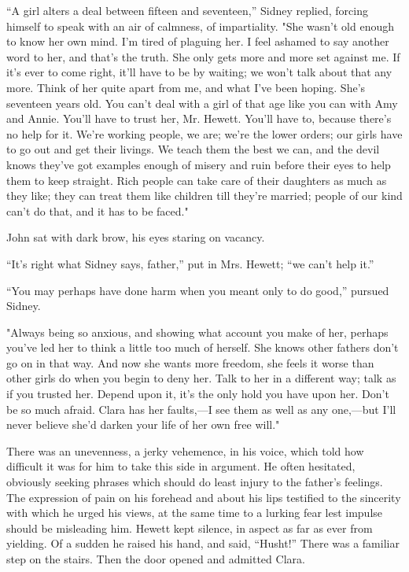 ``A girl alters a deal between fifteen and seventeen,'' Sidney replied,
forcing himself to speak with an air of calmness, of impartiality. "She
wasn't old enough to know her own mind. I'm tired of plaguing her. I
feel ashamed to say another word to her, and that's the truth. She only
gets more and more set against me. If it's ever to come right, it'll
have to be by waiting; we won't talk about that any more. Think of her
quite apart from me, and what I've been hoping. She's seventeen years
old. You can't deal with a girl of that age like you can with Amy and
Annie. You'll have to trust her, Mr. Hewett. You'll have to, because
there's no help for it. We're working people, we are; we're the lower
orders; our {\protect\hypertarget{58}{}{}}girls have to go out and get
their livings. We teach them the best we can, and the devil knows
they've got examples enough of misery and ruin before their eyes to help
them to keep straight. Rich people can take care of their daughters as
much as they like; they can treat them like children till they're
married; people of our kind can't do that, and it has to be faced."

John sat with dark brow, his eyes staring on vacancy.

``It's right what Sidney says, father,'' put in Mrs. Hewett; ``we can't
help it.''

``You may perhaps have done harm when you meant only to do good,''
pursued Sidney.

"Always being so anxious, and showing what account you make of her,
perhaps you've led her to think a little too much of herself. She knows
other fathers don't go on in that way. And now she wants more freedom,
she feels it worse than other girls do when you begin to deny her. Talk
to her in a different way; talk as if you trusted her. Depend upon it,
it's the only hold you have upon her. Don't
{\protect\hypertarget{59}{}{}}be so much afraid. Clara has her
faults,---I see them as well as any one,---but I'll never believe she'd
darken your life of her own free will."

There was an unevenness, a jerky vehemence, in his voice, which told how
difficult it was for him to take this side in argument. He often
hesitated, obviously seeking phrases which should do least injury to the
father's feelings. The expression of pain on his forehead and about his
lips testified to the sincerity with which he urged his views, at the
same time to a lurking fear lest impulse should be misleading him.
Hewett kept silence, in aspect as far as ever from yielding. Of a sudden
he raised his hand, and said, ``Husht!'' There was a familiar step on
the stairs. Then the door opened and admitted Clara.

